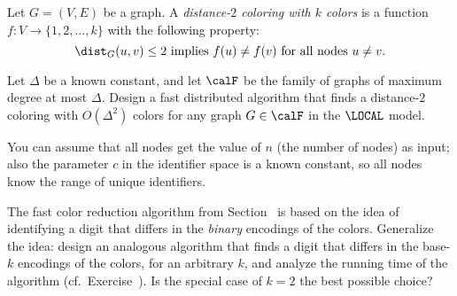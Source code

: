 \begin{ex}\label{ex:distance2col}
    Let $G = (V,E)$ be a graph. A \emph{distance-$2$ coloring with $k$ colors} is a function $f \colon V \to \{1,2,\dotsc,k\}$ with the following property:
    \[
        \dist_G(u,v) \le 2 \text{ implies } f(u) \ne f(v) \text{ for all nodes } u \ne v.
    \]

    Let $\Delta$ be a known constant, and let $\calF$ be the family of graphs of maximum degree at most $\Delta$. Design a fast distributed algorithm that finds a distance-$2$ coloring with $O(\Delta^2)$ colors for any graph $G \in \calF$ in the $\LOCAL$ model.

    You can assume that all nodes get the value of $n$ (the number of nodes) as input; also the parameter $c$ in the identifier space is a known constant, so all nodes know the range of unique identifiers.

\end{ex}

\begin{exs}\label{ex:dpbit-base}
    The fast color reduction algorithm from Section~ is based on the idea of identifying a digit that differs in the \emph{binary} encodings of the colors. Generalize the idea: design an analogous algorithm that finds a digit that differs in the base-$k$ encodings of the colors, for an arbitrary $k$, and analyze the running time of the algorithm (cf.\ Exercise~). Is the special case of $k = 2$ the best possible choice?
\end{exs}

